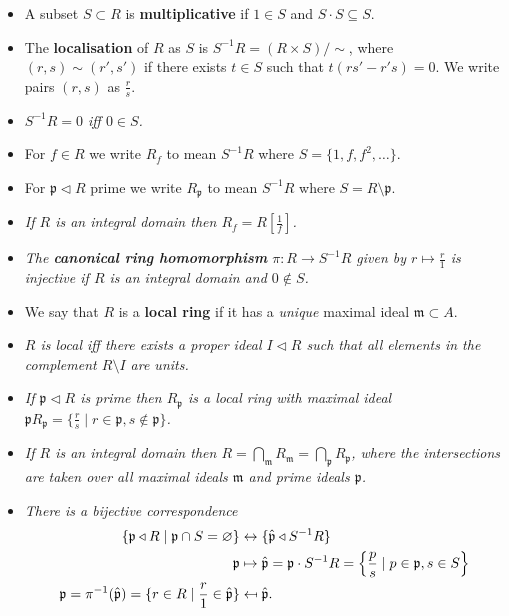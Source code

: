 \documentclass[10pt]{article}
\newcommand{\prid}{\mathfrak{p}}
\newcommand{\maid}{\mathfrak{m}}
\newcommand\mapsfrom{\mathrel{\reflectbox{\ensuremath{\mapsto}}}}
\begin{document}
            \begin{itemize}
                \item A subset $S\subset R$ is \textbf{multiplicative} if $1\in S$ and $S\cdot S\subseteq S$.
                \item The \textbf{localisation} of $R$ as $S$ is $S^{-1}R=(R\times S)/\sim$, where $(r,s)\sim(r',s')$ if there exists $t\in S$ such that $t(rs'-r's)=0$.
                    We write pairs $(r,s)$ as $\frac{r}{s}$.
                \item \emph{$S^{-1}R=0$ iff $0\in S$.}
                \item For $f\in R$ we write $R_f$ to mean $S^{-1}R$ where $S=\{1,f,f^2,\ldots\}$.
                \item For $\prid\triangleleft R$ prime we write $R_\prid$ to mean $S^{-1}R$ where $S=R\setminus\prid$.
                \item \emph{If $R$ is an integral domain then $R_f=R[\frac{1}{f}]$.}
                \item \emph{The \textbf{canonical ring homomorphism} $\pi\colon R\to S^{-1}R$ given by $r\mapsto\frac{r}{1}$ is injective if $R$ is an integral domain and $0\not\in S$.}
                \item We say that $R$ is a \textbf{local ring} if it has a \emph{unique} maximal ideal $\mathfrak{m}\subset A$.
                \item \emph{$R$ is local iff there exists a \emph{proper} ideal $I\triangleleft R$ such that all elements in the complement $R\setminus I$ are units.}
                \item \emph{If $\prid\triangleleft R$ is prime then $R_\prid$ is a local ring with maximal ideal $\prid R_\prid=\{\frac{r}{s}\mid r\in\prid,s\not\in\prid\}$.}
                \item \emph{If $R$ is an integral domain then $R=\bigcap_\maid R_\maid=\bigcap_\prid R_\prid$, where the intersections are taken over all maximal ideals $\maid$ and prime ideals $\prid$.}
                \item \emph{There is a bijective correspondence}
                    \begin{align*}
                        \{\prid\triangleleft R\mid\prid\cap S=\varnothing\} &\leftrightarrow \{\hat{\prid}\triangleleft S^{-1}R\}\\
                        \prid &\mapsto \hat{\prid}=\prid\cdot S^{-1}R=\left\{\frac{p}{s}\mid p\in\prid, s\in S\right\}\\
                        \prid=\pi^{-1}(\hat{\prid})=\{r\in R\mid \frac{r}{1}\in\hat{\prid}\}&\mapsfrom\hat{\prid}.

\end{align*}
\end{itemize}
\end{document}
